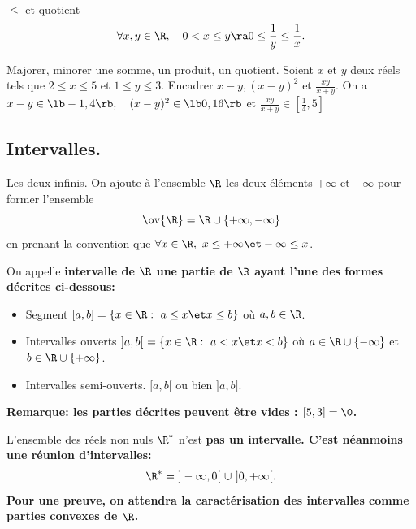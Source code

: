 \documentclass[11pt]{article}
\begin{document}
\begin{rappel}{$\leq$ et quotient}{}
    \begin{equation*}
        \forall x,y\in\R,\quad 0<x\leq y \ra 0\leq\frac{1}{y}\leq\frac{1}{x}.
    \end{equation*}
\end{rappel}

\begin{ex}{Majorer, minorer une somme, un produit, un quotient.}{}
    Soient $x$ et $y$ deux réels tels que $2\leq x\leq 5$ et $1 \leq y \leq 3$. Encadrer $x-y,(x-y)^2$ et \Large $\frac{xy}{x+y}$.
    \tcblower
    On a $x-y\in\lb-1,4\rb, \quad (x-y)^2\in\lb0,16\rb$ et \Large$\frac{xy}{x+y}$\normalsize$\in\left[\frac{1}{4},5\right]$
\end{ex}

\subsection{Intervalles.}

\begin{defi}{Les deux infinis.}{}
    On ajoute à l'ensemble $\R$ les deux éléments $+\infty$ et $-\infty$ pour former l'ensemble
    \begin{equation*}
        \ov{\R}=\R\cup\{+\infty,-\infty\}
    \end{equation*}
    en prenant la convention que $\forall x\in\R,~ x\leq+\infty\et-\infty\leq x$.
\end{defi}

\begin{defi}{}{}
    On appelle \bf{intervalle} de $\R$ une partie de $\R$ ayant l'une des formes décrites ci-dessous:
    \begin{itemize}
        \item Segment $[a,b]=\{x\in\R:~a\leq x\et x\leq b\}$ où $a,b\in\R$.
        \item Intervalles ouverts $]a,b[~=\{x\in\R:~a<x\et x<b\}$ où $a\in\R\cup\{-\infty\}$ et $b\in\R\cup\{+\infty\}$.
        \item Intervalles semi-ouverts. $[a,b[$ ou bien $]a,b]$.
    \end{itemize}
    \bf{Remarque:} les parties décrites peuvent être vides : $[5,3]=\0$.
\end{defi}

\begin{ex}{}{}
    L'ensemble des réels non nuls $\R^*$ n'est \bf{pas} un intervalle. C'est néanmoins une réunion d'intervalles:
    \begin{equation*}
        \R^*=~]-\infty,0[~\cup~]0,+\infty[.
    \end{equation*}
    Pour une preuve, on attendra la caractérisation des intervalles comme parties convexes de $\R$.
\end{ex}
\end{document}
